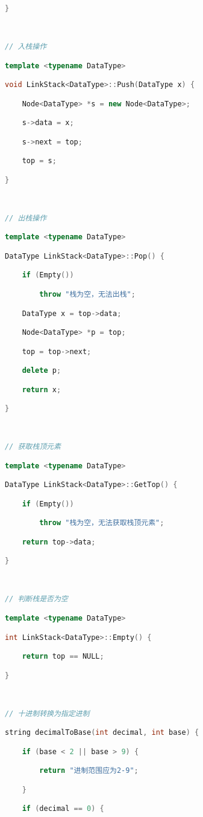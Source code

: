 \begin{lstlisting}[language=C++]
}

  

// 入栈操作

template <typename DataType>

void LinkStack<DataType>::Push(DataType x) {

    Node<DataType> *s = new Node<DataType>;

    s->data = x;

    s->next = top;

    top = s;

}

  

// 出栈操作

template <typename DataType>

DataType LinkStack<DataType>::Pop() {

    if (Empty())

        throw "栈为空，无法出栈";

    DataType x = top->data;

    Node<DataType> *p = top;

    top = top->next;

    delete p;

    return x;

}

  

// 获取栈顶元素

template <typename DataType>

DataType LinkStack<DataType>::GetTop() {

    if (Empty())

        throw "栈为空，无法获取栈顶元素";

    return top->data;

}

  

// 判断栈是否为空

template <typename DataType>

int LinkStack<DataType>::Empty() {

    return top == NULL;

}

  

// 十进制转换为指定进制

string decimalToBase(int decimal, int base) {

    if (base < 2 || base > 9) {

        return "进制范围应为2-9";

    }

    if (decimal == 0) {


\end{lstlisting}
